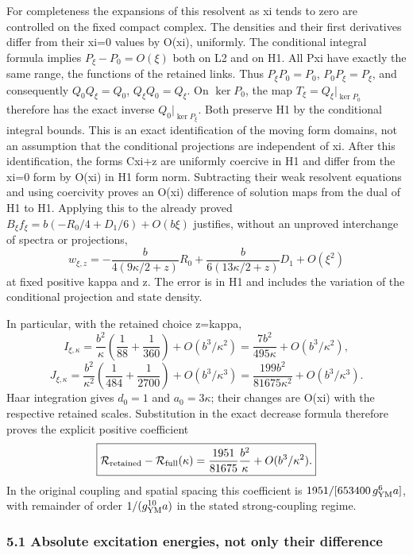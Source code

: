\documentclass[
  11pt,
]{article}
\begin{document}
For completeness the expansions of this resolvent as xi tends to zero
are controlled on the fixed compact complex. The densities and their
first derivatives differ from their xi=0 values by O(xi), uniformly. The
conditional integral formula implies \(P_\xi-P_0=O(\xi)\) both on L2 and
on H1. All Pxi have exactly the same range, the functions of the
retained links. Thus \(P_\xi P_0=P_0\), \(P_0P_\xi=P_\xi\), and
consequently \(Q_0Q_\xi=Q_0\), \(Q_\xi Q_0=Q_\xi\). On \(\ker P_0\), the
map \(T_\xi=Q_\xi|_{\ker P_0}\) therefore has the exact inverse
\(Q_0|_{\ker P_\xi}\). Both preserve H1 by the conditional integral
bounds. This is an exact identification of the moving form domains, not
an assumption that the conditional projections are independent of xi.
After this identification, the forms Cxi+z are uniformly coercive in H1
and differ from the xi=0 form by O(xi) in H1 form norm. Subtracting
their weak resolvent equations and using coercivity proves an O(xi)
difference of solution maps from the dual of H1 to H1. Applying this to
the already proved \(B_\xi f_\xi=b(-R_0/4+D_1/6)+O(b\xi)\) justifies,
without an unproved interchange of spectra or projections, \[
 w_{\xi,z}=-\frac{b}{4(9\kappa/2+z)}R_0
             +\frac{b}{6(13\kappa/2+z)}D_1+O(\xi^2)
\] at fixed positive kappa and z. The error is in H1 and includes the
variation of the conditional projection and state density.

In particular, with the retained choice z=kappa, \[
 I_{\xi,\kappa}=\frac{b^2}{\kappa}
           \left(\frac1{88}+\frac1{360}\right)+O(b^3/\kappa^2)
           =\frac{7b^2}{495\kappa}+O(b^3/\kappa^2),
\] \[
 J_{\xi,\kappa}=\frac{b^2}{\kappa^2}
           \left(\frac1{484}+\frac1{2700}\right)+O(b^3/\kappa^3)
           =\frac{199b^2}{81675\kappa^2}+O(b^3/\kappa^3).
\] Haar integration gives \(d_0=1\) and \(a_0=3\kappa\); their changes
are O(xi) with the respective retained scales. Substitution in the exact
decrease formula therefore proves the explicit positive coefficient \[
 \boxed{\mathcal R_{\rm retained}-\mathcal R_{\rm full}(\kappa)
     =\frac{1951}{81675}\frac{b^2}{\kappa}
          +O(b^3/\kappa^2).}
\] In the original coupling and spatial spacing this coefficient is
\(1951/[653400\,g_{\rm YM}^6a]\), with remainder of order
\(1/(g_{\rm YM}^{10}a)\) in the stated strong-coupling regime.

\subsubsection{5.1 Absolute excitation energies, not only their
difference}\label{absolute-excitation-energies-not-only-their-difference}
\end{document}
